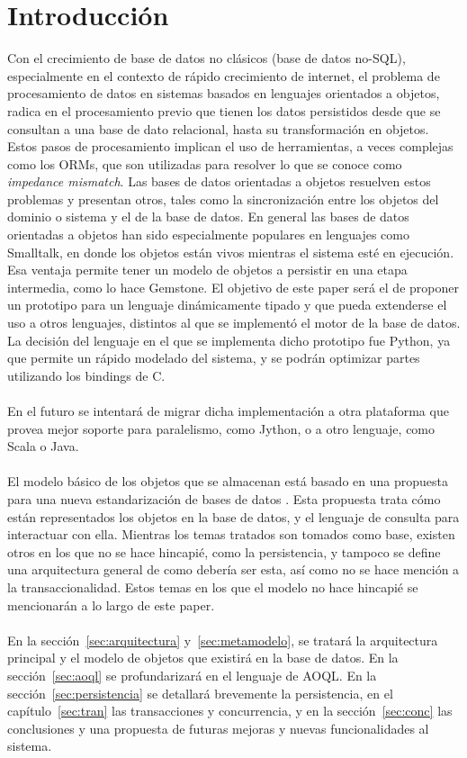 \documentclass{melta}
\begin{document}
\section{Introducción}
\label{sec:introduccion}
Con el crecimiento de base de datos no clásicos (base de datos no-SQL), especialmente en el contexto de rápido crecimiento de internet, el problema de procesamiento de datos en sistemas basados en lenguajes orientados a objetos, radica en el procesamiento previo que tienen los datos persistidos desde que se consultan a una base de dato relacional, hasta su transformación en objetos. Estos pasos de procesamiento implican el uso de herramientas, a veces complejas como los ORMs, que son utilizadas para resolver lo que se conoce como \textit{impedance mismatch}\cite{arch:MFowler}.
Las bases de datos orientadas a objetos resuelven estos problemas y presentan otros, tales como la sincronización entre los objetos del dominio o sistema y el de la base de datos. 
En general las bases de datos orientadas a objetos han sido especialmente populares en lenguajes como Smalltalk, en donde los objetos están vivos mientras el sistema esté en ejecución. Esa ventaja permite tener un modelo de objetos a persistir en una etapa intermedia, como lo hace Gemstone. El objetivo de este paper será el de proponer un prototipo para un lenguaje dinámicamente tipado y que pueda extenderse el uso a otros lenguajes, distintos al que se implementó el motor de la base de datos.
La decisión del lenguaje en el que se implementa dicho prototipo fue Python, ya que permite un rápido modelado del sistema, y se podrán optimizar partes utilizando los bindings de C. 
\\\\
En el futuro se intentará de migrar dicha implementación a otra plataforma que provea mejor soporte para paralelismo, como Jython, o a otro lenguaje, como Scala o Java.
\\\\
El modelo básico de los objetos que se almacenan está basado en una propuesta para una nueva estandarización de bases de datos \cite{OMG:oodbs}. Esta propuesta trata cómo están representados los objetos en la base de datos, y el lenguaje de consulta para interactuar con ella. Mientras los temas tratados son tomados como base, existen otros en los que no se hace hincapié, como la persistencia, y tampoco se define una arquitectura general de como debería ser esta, así como no se hace mención a la transaccionalidad. Estos temas en los que el modelo no hace hincapié se mencionarán a lo largo de este paper.
\\\\
En la sección~\ref{sec:arquitectura} y~\ref{sec:metamodelo}, se tratará la arquitectura principal y el modelo de objetos que existirá en la base de datos. En la sección~\ref{sec:aoql} se profundarizará en el lenguaje de AOQL\@. En la sección~\ref{sec:persistencia} se detallará brevemente la persistencia, en el capítulo~\ref{sec:tran} las transacciones y concurrencia, y en la sección~\ref{sec:conc} las conclusiones y una propuesta de futuras mejoras y nuevas funcionalidades al sistema. 
\end{document}
